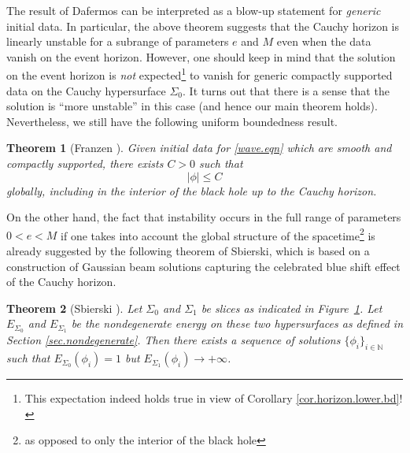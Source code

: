 \documentclass[12 pt, reqno]{amsart}
\newtheorem{theorem}{Theorem}[section]
\theoremstyle{definition}
\theoremstyle{remark}
\numberwithin{equation}{section}
\newcommand{\0}{\emptyset}
\begin{document}
The result of Dafermos can be interpreted as a blow-up statement for \emph{generic} initial data. In particular, the above theorem suggests that the Cauchy horizon is linearly unstable for a subrange of parameters $e$ and $M$ even when the data vanish on the event horizon. However, one should keep in mind that the solution on the event horizon is \emph{not} expected\footnote{This expectation indeed holds true in view of Corollary \ref{cor.horizon.lower.bd}!} to vanish for generic compactly supported data on the Cauchy hypersurface $\Sigma_0$. It turns out that there is a sense that the solution is ``more unstable'' in this case (and hence our main theorem holds). Nevertheless, we still have the following uniform boundedness result.

\begin{theorem}[Franzen \cite{Fra}]\label{thm.Fra}
Given initial data for \eqref{wave.eqn} which are smooth and compactly supported, there exists $C>0$ such that 
$$|\phi|\leq C$$
globally, including in the interior of the black hole up to the Cauchy horizon.
\end{theorem}

On the other hand, the fact that instability occurs in the full range of parameters $0<e<M$ if one takes into account the global structure of the spacetime\footnote{as opposed to only the interior of the black hole} is already suggested by the following theorem of Sbierski, which is based on a construction of Gaussian beam solutions capturing the celebrated blue shift effect of the Cauchy horizon.
\begin{figure}[h]
\begin{center}
\def\svgwidth{200px}
 
\caption{} \label{fig:sbierski}
\end{center}
\end{figure}

\begin{theorem}[Sbierski \cite{Sbi.1}]
Let $\Sigma_0$ and $\Sigma_1$ be slices as indicated in Figure~\ref{fig:sbierski}. 
Let $E_{\Sigma_0}$ and $E_{\Sigma_1}$ be the nondegenerate energy on these two hypersurfaces as defined in Section \ref{sec.nondegenerate}.
Then there exists a sequence of solutions $\{\phi_i\}_{i\in\mathbb N}$ such that $E_{\Sigma_0}(\phi_i)=1$ but $E_{\Sigma_1}(\phi_i)\to +\infty$.
\end{theorem}
\end{document}
